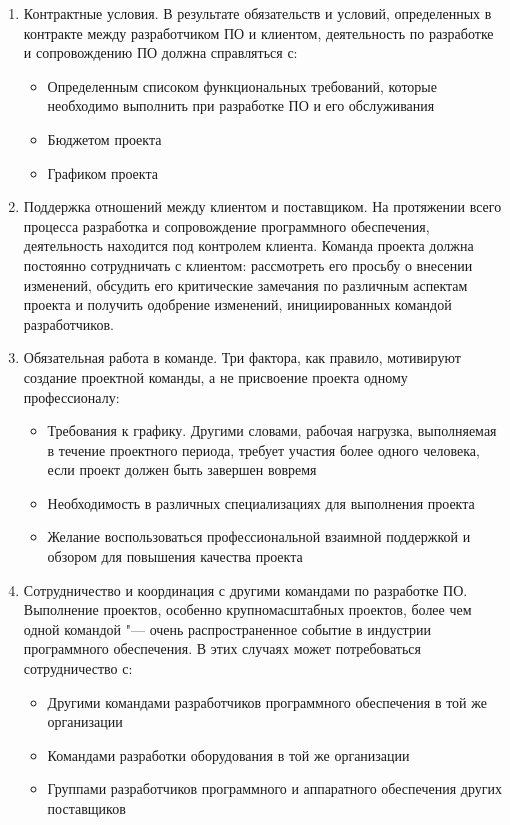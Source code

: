\documentclass{../industrial-development}
\begin{document}
 	 \begin{enumerate}
\item Контрактные условия. В результате обязательств и условий, определенных в контракте между разработчиком ПО и клиентом, деятельность по разработке и сопровождению ПО должна справляться с:
		 \begin{itemize}
	\item Определенным списоком функциональных требований, которые необходимо выполнить при разработке ПО и его обслуживания
	\item Бюджетом проекта
	\item Графиком проекта
		\end{itemize}
\item Поддержка отношений между клиентом и поставщиком. На протяжении всего процесса разработка и сопровождение программного обеспечения, деятельность находится под контролем клиента. Команда проекта должна постоянно сотрудничать с клиентом: рассмотреть его просьбу о внесении изменений, обсудить его критические замечания по различным аспектам проекта и получить одобрение изменений, инициированных командой разработчиков. 
\item Обязательная работа в команде. Три фактора, как правило, мотивируют создание проектной команды, а не присвоение проекта одному профессионалу:
		 \begin{itemize}
	\item Требования к графику. Другими словами, рабочая нагрузка, выполняемая в течение проектного периода, требует участия более одного человека, если проект должен быть завершен вовремя
	\item Необходимость в различных специализациях для выполнения проекта
	\item Желание воспользоваться профессиональной взаимной поддержкой и обзором для повышения качества проекта
		\end{itemize}
\item Сотрудничество и координация с другими командами по разработке ПО. Выполнение проектов, особенно крупномасштабных проектов, более чем одной командой "--- очень распространенное событие в индустрии программного обеспечения. В этих случаях может потребоваться сотрудничество с:
		 \begin{itemize}
	\item Другими командами разработчиков программного обеспечения в той же организации
	\item Командами разработки оборудования в той же организации
	\item Группами разработчиков программного и аппаратного обеспечения других поставщиков

\end{itemize}
\end{enumerate}
\end{document}
